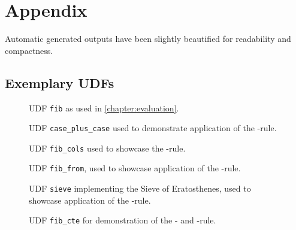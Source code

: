 \cleardoublepage
\renewcommand{\thesection}{\Alph{section}}%

\chapter[Appendix]{Appendix}
Automatic generated outputs have been slightly beautified for readability and compactness.

\section{Exemplary UDFs}

\begin{figure}[h!]
    \centering
    
    \caption{UDF \texttt{fib} as used in \autoref{chapter:evaluation}.}
    \label{udf:fib}
\end{figure}

\begin{figure}[h!]
    \centering
    
    \caption{UDF \texttt{case\_plus\_case} used to demonstrate application of the \REXPR-rule.}
    \label{udf:case_plus_case}
\end{figure}

\begin{figure}[h!]
    \centering
    
    \caption{UDF \texttt{fib\_cols} used to showcase the \RSELECT-rule.}
    \label{udf:fib_cols}
\end{figure}

\begin{figure}[h!]
    \centering
    
    \caption{UDF \texttt{fib\_from}, used to showcase application of the \RFROM-rule.}
    \label{udf:fib_from}
\end{figure}

\begin{figure}[h!]
    \centering
    
    \caption{UDF \texttt{sieve} implementing the Sieve of Eratosthenes, used to showcase application of the \RWHERE-rule.}
    \label{udf:sieve}
\end{figure}

\begin{figure}[h!]
    \centering
    
    \caption{UDF \texttt{fib\_cte} for demonstration of the \RCTE- and \RWITH-rule.}
    \label{udf:fib_cte}
\end{figure}


